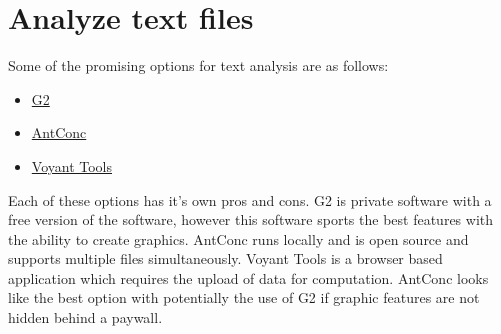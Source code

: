 \documentclass{article}
\begin{document}
\section{Analyze text files}
Some of the promising options for text analysis are as follows:
\begin{itemize}
    \item \href{https://www.g2.com/categories/text-analysis}{G2}
    \item \href{https://www.laurenceanthony.net/software/antconc/}{AntConc}
    \item \href{Voyant-tools.org}{Voyant Tools}
\end{itemize}

\noindent 
Each of these options has it's own pros and cons. G2 is private software with a free version of the software, however this software sports the best features with the ability to create graphics. AntConc runs locally and is open source and supports multiple files simultaneously. Voyant Tools is a browser based application which requires the upload of data for computation. AntConc looks like the best option with potentially the use of G2 if graphic features are not hidden behind a paywall.
\
\end{document}
